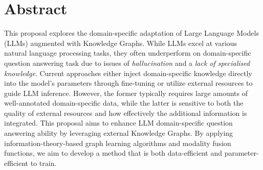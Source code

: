 \section*{Abstract}
This proposal explores the domain-specific adaptation of Large Language Models (LLMs) augmented with Knowledge Graphs. 
While LLMs excel at various natural language processing tasks, they often underperform on domain-specific question answering task due to issues of \emph{hallucination} and a \emph{lack of specialised knowledge}. 
Current approaches either inject domain-specific knowledge directly into the model's parameters through fine-tuning or utilize external resources to guide LLM inference. 
However, the former typically requires large amounts of well-annotated domain-specific data, while the latter is sensitive to both the quality of external resources and how effectively the additional information is integrated. 
This proposal aims to enhance LLM domain-specific question answering ability by leveraging external Knowledge Graphs. 
By applying information-theory-based graph learning algorithms and modality fusion functions, we aim to develop a method that is both data-efficient and parameter-efficient to train. 
